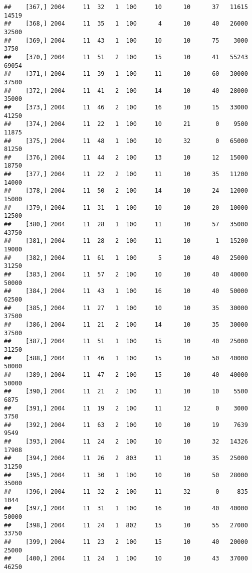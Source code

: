 \documentclass{article}\usepackage[]{graphicx}\usepackage[]{color}
\makeatletter
\newenvironment{kframe}{%
 \def\at@end@of@kframe{}%
 \ifinner\ifhmode%
  \def\at@end@of@kframe{\end{minipage}}%
  \begin{minipage}{\columnwidth}%
 \fi\fi%
 \def\FrameCommand##1{\hskip\@totalleftmargin \hskip-\fboxsep
 \colorbox{shadecolor}{##1}\hskip-\fboxsep
     \hskip-\linewidth \hskip-\@totalleftmargin \hskip\columnwidth}%
 \MakeFramed {\advance\hsize-\width
   \@totalleftmargin\z@ \linewidth\hsize
   \@setminipage}}%
 {\par\unskip\endMakeFramed%
 \at@end@of@kframe}
\newenvironment{knitrout}{}{} %
\makeatother
\begin{document}
\begin{knitrout}
\begin{kframe}
\begin{verbatim}
##    [367,] 2004     11  32   1  100     10      10      37   11615   14519
##    [368,] 2004     11  35   1  100      4      10      40   26000   32500
##    [369,] 2004     11  43   1  100     10      10      75    3000    3750
##    [370,] 2004     11  51   2  100     15      10      41   55243   69054
##    [371,] 2004     11  39   1  100     11      10      60   30000   37500
##    [372,] 2004     11  41   2  100     14      10      40   28000   35000
##    [373,] 2004     11  46   2  100     16      10      15   33000   41250
##    [374,] 2004     11  22   1  100     10      21       0    9500   11875
##    [375,] 2004     11  48   1  100     10      32       0   65000   81250
##    [376,] 2004     11  44   2  100     13      10      12   15000   18750
##    [377,] 2004     11  22   2  100     11      10      35   11200   14000
##    [378,] 2004     11  50   2  100     14      10      24   12000   15000
##    [379,] 2004     11  31   1  100     10      10      20   10000   12500
##    [380,] 2004     11  28   1  100     11      10      57   35000   43750
##    [381,] 2004     11  28   2  100     11      10       1   15200   19000
##    [382,] 2004     11  61   1  100      5      10      40   25000   31250
##    [383,] 2004     11  57   2  100     10      10      40   40000   50000
##    [384,] 2004     11  43   1  100     16      10      40   50000   62500
##    [385,] 2004     11  27   1  100     10      10      35   30000   37500
##    [386,] 2004     11  21   2  100     14      10      35   30000   37500
##    [387,] 2004     11  51   1  100     15      10      40   25000   31250
##    [388,] 2004     11  46   1  100     15      10      50   40000   50000
##    [389,] 2004     11  47   2  100     15      10      40   40000   50000
##    [390,] 2004     11  21   2  100     11      10      10    5500    6875
##    [391,] 2004     11  19   2  100     11      12       0    3000    3750
##    [392,] 2004     11  63   2  100     10      10      19    7639    9549
##    [393,] 2004     11  24   2  100     10      10      32   14326   17908
##    [394,] 2004     11  26   2  803     11      10      35   25000   31250
##    [395,] 2004     11  30   1  100     10      10      50   28000   35000
##    [396,] 2004     11  32   2  100     11      32       0     835    1044
##    [397,] 2004     11  31   1  100     16      10      40   40000   50000
##    [398,] 2004     11  24   1  802     15      10      55   27000   33750
##    [399,] 2004     11  23   2  100     15      10      40   20000   25000
##    [400,] 2004     11  24   1  100     10      10      43   37000   46250

\end{verbatim}
\end{kframe}
\end{knitrout}
\end{document}

